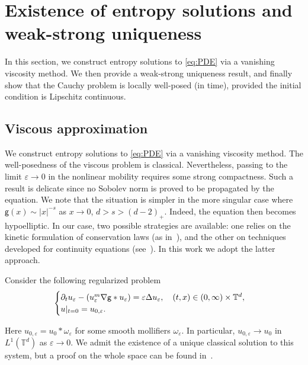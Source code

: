 \documentclass[11pt]{article}
\numberwithin{equation}{section} %
\newcommand{\p}{{\partial}}
\newcommand{\T}{{\mathbb{T}}}
\newcommand{\g}{{\mathsf{g}}}
\newcommand{\eps}{\varepsilon}
\newcommand{\D}{\Delta}
\newcommand{\ep}{\varepsilon}
\let\div\relax
\DeclareMathOperator{\div}{\mathsf{div}}
\def \ep{\varepsilon}
\def\nab{\nabla}
\begin{document}
\section{Existence of entropy solutions and weak-strong uniqueness}

In this section, we construct entropy solutions to \eqref{eq:PDE} via a vanishing viscosity method. We then provide a weak-strong uniqueness result, and finally show that the Cauchy problem is locally well-posed (in time), provided the initial condition is Lipschitz continuous.

\subsection{Viscous approximation}

We construct entropy solutions to \eqref{eq:PDE} via a vanishing viscosity method. The well-posedness of the viscous problem is classical. Nevertheless, passing to the limit $\varepsilon \to 0$ in the nonlinear mobility requires some strong compactness. Such a result is delicate since no Sobolev norm is proved to be propagated by the equation. We note that the situation is simpler in the more singular case where $\g(x) \sim |x|^{-s}$ as $x\to 0$, $d>s>(d-2)_+$. Indeed, the equation then becomes hypoelliptic. In our case, two possible strategies are available: one relies on the kinetic formulation of conservation laws (as in~\cite{perthame_existence_2006}), and the other on techniques developed for continuity equations (see~\cite{belgacemjabin2013}). In this work we adopt the latter approach.

Consider the following regularized problem
\begin{equation}\label{eq:viscousPDE}
\begin{cases}
    \p_t u_\ep -\div (u^m_\ep \nab\g\ast u_\ep) = \ep \D u_\ep, \quad (t,x)\in (0,\infty)\times \T^d,\\
    u\vert_{t=0} = u_{0,\ep}.
\end{cases}
\end{equation}

Here $u_{0,\ep}=u_{0}\ast\omega_{\eps}$ for some smooth mollifiers $\omega_{\eps}$. In particular, $u_{0,\eps}\to u_{0}$ in $L^{1}(\T^d)$ as $\eps\to 0$. We admit the existence of a unique classical solution to this system, but a proof on the whole space can be found in~\cite{CGV22FastRegularisation}. 
\end{document}
